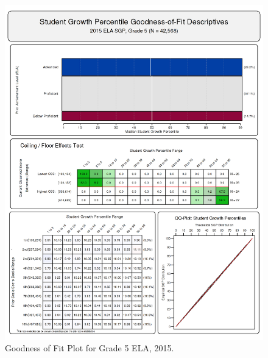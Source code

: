 \documentclass[12pt]{article}
\begin{document}
\begin{figure}[htbp]
\centering
\includegraphics{../img/Goodness_of_Fit/ELA.2015/2015_ELA_5;2014_ELA_4;2013_ELA_3.png}
\caption{Goodness of Fit Plot for Grade 5 ELA, 2015.}
\end{figure}
\end{document}

